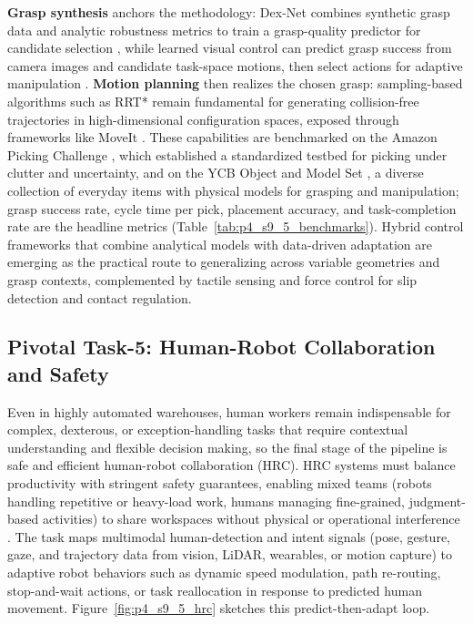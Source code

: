 \textbf{Grasp synthesis} anchors the methodology: Dex-Net combines synthetic grasp data and analytic robustness metrics to train a grasp-quality predictor for candidate selection \cite{Mahler2017DexNet}, while learned visual control can predict grasp success from camera images and candidate task-space motions, then select actions for adaptive manipulation \cite{Levine2016DeepGrasp}. 
\textbf{Motion planning} then realizes the chosen grasp: sampling-based algorithms such as RRT* \cite{Karaman2011RRTStar} remain fundamental for generating collision-free trajectories in high-dimensional configuration spaces, exposed through frameworks like MoveIt \cite{Sucan2010MoveIt}. 
These capabilities are benchmarked on the Amazon Picking Challenge \cite{Correll2016AmazonChallenge}, which established a standardized testbed for picking under clutter and uncertainty, and on the YCB Object and Model Set \cite{Calli2015YCB}, a diverse collection of everyday items with physical models for grasping and manipulation; grasp success rate, cycle time per pick, placement accuracy, and task-completion rate are the headline metrics (Table~\ref{tab:p4_s9_5_benchmarks}). 
Hybrid control frameworks that combine analytical models with data-driven adaptation are emerging as the practical route to generalizing across variable geometries and grasp contexts, complemented by tactile sensing and force control for slip detection and contact regulation.

\subsection{Pivotal Task-5: Human-Robot Collaboration and Safety}
\label{subsec:p4-sec9-5-pivotal-task-5-human-robot-collaboration-and-safety}
Even in highly automated warehouses, human workers remain indispensable for complex, dexterous, or exception-handling tasks that require contextual understanding and flexible decision making, so the final stage of the pipeline is safe and efficient human-robot collaboration (HRC). 
HRC systems must balance productivity with stringent safety guarantees, enabling mixed teams (robots handling repetitive or heavy-load work, humans managing fine-grained, judgment-based activities) to share workspaces without physical or operational interference \cite{Lasota2015HRC}. 
The task maps multimodal human-detection and intent signals (pose, gesture, gaze, and trajectory data from vision, LiDAR, wearables, or motion capture) to adaptive robot behaviors such as dynamic speed modulation, path re-routing, stop-and-wait actions, or task reallocation in response to predicted human movement. Figure~\ref{fig:p4_s9_5_hrc} sketches this predict-then-adapt loop.


